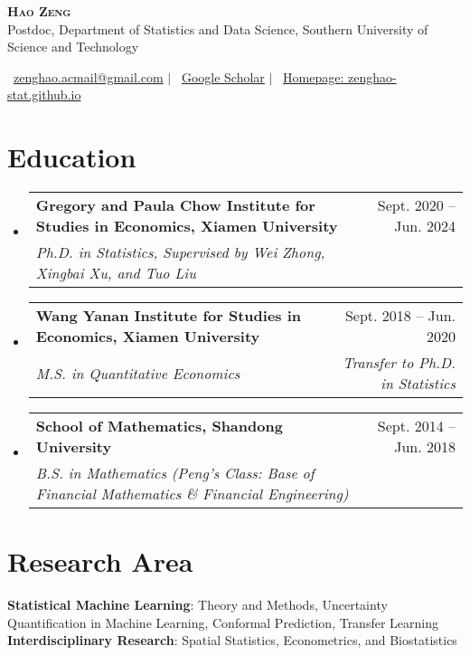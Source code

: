 \documentclass[letterpaper,10pt]{article}
\makeatletter
\newcommand{\resumeSubheading}[4]{
  \vspace{-2pt}\item
    \begin{tabular*}{0.97\textwidth}[t]{l@{\extracolsep{\fill}}r}
      \textbf{#1} & #2 \\
      \textit{\small#3} & \textit{\small #4} \\
    \end{tabular*}\vspace{-7pt}
}
\newcommand{\resumeSubHeadingListStart}{\begin{itemize}[leftmargin=0.15in, label={}]}
\newcommand{\resumeSubHeadingListEnd}{\end{itemize}}
\makeatother
\begin{document}
\begin{center}
    \textbf{\Huge \scshape Hao Zeng}
    \vspace{0.5em}\\
    {\small Postdoc, Department of Statistics and Data Science, Southern University of Science and Technology}
\end{center}

\begin{center}
    \small {}\ \href{mailto:zenghao.acmail@gmail.com}{zenghao.acmail@gmail.com} $|$
    \ \href{https://scholar.google.com/citations?user=-EiBHeIAAAAJ&hl=en}{Google Scholar} $|$
    \ \href{https://zenghao-stat.github.io}{Homepage: zenghao-stat.github.io}
\end{center}

\section{Education}
  \resumeSubHeadingListStart
    \resumeSubheading
      {Gregory and Paula Chow Institute for Studies in Economics, Xiamen University}{Sept. 2020 -- Jun. 2024}
      {Ph.D. in Statistics, Supervised by Wei Zhong, Xingbai Xu, and Tuo Liu}{}
    
    \resumeSubheading
      {Wang Yanan Institute for Studies in Economics, Xiamen University}{Sept. 2018 -- Jun. 2020}
      {M.S. in Quantitative Economics}{Transfer to Ph.D. in Statistics}
    
    \resumeSubheading
      {School of Mathematics, Shandong University}{Sept. 2014 -- Jun. 2018}
      {B.S. in Mathematics (Peng's Class: Base of Financial Mathematics \& Financial Engineering)}{}
  \resumeSubHeadingListEnd


\section{Research Area}
\begin{itemize}[leftmargin=0.15in, label={}]
    \small{\item{
     \textbf{Statistical Machine Learning}{: Theory and Methods, Uncertainty Quantification in Machine Learning, Conformal Prediction, Transfer Learning} \\
     \textbf{Interdisciplinary Research}{: Spatial Statistics, Econometrics, and Biostatistics}
    }}
\end{itemize}
\end{document}
